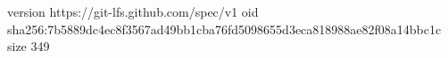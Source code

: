 version https://git-lfs.github.com/spec/v1
oid sha256:7b5889dc4ec8f3567ad49bb1cba76fd5098655d3eca818988ae82f08a14bbc1c
size 349

